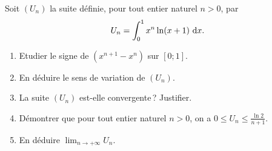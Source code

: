 %
\begin{exo}
            Soit $(U_n)$ la suite d\'efinie, pour tout entier naturel $n>0$, par
            \[
                  U_n=\int_{0}^{1}x^n\ln(x+1)~\mathrm{d}x.
            \]
            \begin{enumerate}
                  \item Etudier le signe de $(x^{n+1} - x^n)$ sur $[0 ; 1]$.
                  \item En d\'eduire le sens de variation de $(U_n)$.
                  \item La suite $(U_n)$ est-elle convergente\,? Justifier.
                  \item D\'emontrer que pour tout entier naturel $n>0$, on a $0 \leq U_n \leq \frac{\ln 2}{n+1}$.
                  \item En d\'eduire $\displaystyle{\lim_{n\rightarrow+\infty} U_n}$.
            \end{enumerate}
\end{exo}




















